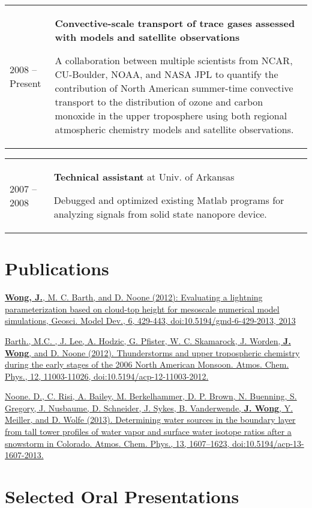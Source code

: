 \documentclass[overlap,12pt,centered]{res}
\makeatletter
\newcommand{\tabulated}{\begin{tabular}{@{}p{1.4in}p{4.9in}}}
\makeatother
\begin{document}
\begin{resume}
		\tabulated				
			2008 -- Present	&	{\bf Convective-scale transport of trace gases assessed with models and satellite observations}
				
				A collaboration between multiple scientists from NCAR, CU-Boulder, NOAA, and NASA JPL to quantify the contribution of North American summer-time convective transport to the distribution of ozone and carbon monoxide in the upper troposphere using both regional atmospheric chemistry models and satellite observations.
		\end{tabular}
		
		\tabulated				
			2007 -- 2008		&	{\bf Technical assistant} at Univ. of Arkansas
		
				Debugged and optimized existing Matlab programs for analyzing signals from solid state nanopore device.
		\end{tabular}
		
		
		\section{\sc Publications}
		\href{http://www.geosci-model-dev.net/6/429/2013/gmd-6-429-2013.html}{\textbf{Wong, J.}, M. C. Barth, and D. Noone (2012): Evaluating a lightning parameterization based on cloud-top height for mesoscale numerical model simulations, Geosci. Model Dev., 6, 429-443, doi:10.5194/gmd-6-429-2013, 2013}
		
		\href{http://www.atmos-chem-phys.net/12/11003/2012/acp-12-11003-2012.html}{Barth., M.C. , J. Lee, A. Hodzic, G. Pfister, W. C. Skamarock, J. Worden, \textbf{J. Wong}, and D. Noone (2012). Thunderstorms and upper tropospheric chemistry during the early stages of the 2006 North American Monsoon. Atmos. Chem. Phys., 12, 11003-11026, doi:10.5194/acp-12-11003-2012.}
		
		\href{http://www.atmos-chem-phys.net/13/1607/2013/acp-13-1607-2013.html}{Noone. D., C. Risi, A. Bailey, M. Berkelhammer, D. P. Brown, N. Buenning, S. Gregory, J. Nusbaume, D. Schneider, J. Sykes, B. Vanderwende, \textbf{J. Wong}, Y. Meiller, and D. Wolfe (2013). Determining water sources in the boundary layer from tall tower profiles of water vapor and surface water isotope ratios after a snowstorm in Colorado. Atmos. Chem. Phys., 13, 1607--1623, doi:10.5194/acp-13-1607-2013.}
		
		\section{\sc Selected Oral Presentations}
		

\end{resume}
\end{document}
